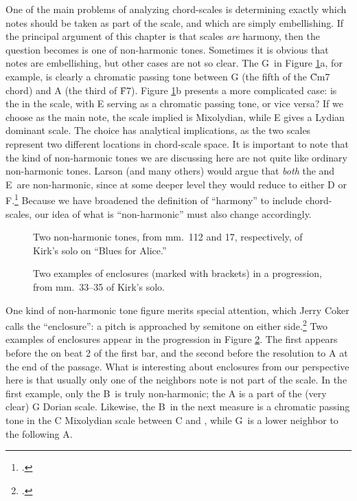 One of the main problems of analyzing chord-scales is determining exactly
which notes should be taken as part of the scale, and which are simply
embellishing. If the principal argument of this chapter is that scales
\emph{are} harmony, then the question becomes is one of non-harmonic tones.
Sometimes it is obvious that notes are embellishing, but other cases are not
so clear. The G\sharp\ in Figure \ref{csa:non-harmonic-tones}a, for example,
is clearly a chromatic passing tone between G (the fifth of the \h{Cm7} chord)
and A (the third of \h{F7}). Figure \ref{csa:non-harmonic-tones}b presents a
more complicated case: is the \Eflat in the scale, with E\nat{} serving as a
chromatic passing tone, or vice versa? If we choose \Eflat as the main note,
the scale implied is \Bflat Mixolydian, while E\nat{} gives a \Bflat Lydian
dominant scale. The choice has analytical implications, as the two scales
represent two different locations in chord-scale space. It is important to
note that the kind of non-harmonic tones we are discussing here are not quite
like ordinary non-harmonic tones. Larson (and many others) would argue that
\emph{both} the \Eflat and E\nat\ are non-harmonic, since at some deeper
level they would reduce to either D or F.\footcite[5--10]{larson:2009} Because
we have broadened the definition of ``harmony'' to include chord-scales, our
idea of what is ``non-harmonic'' must also change accordingly.

\begin{figure}[tbp]
  \caption[Two non-harmonic tones in Kirk's solo.]{Two non-harmonic tones, from
    mm.~112 and 17, respectively, of Kirk's solo on ``Blues for Alice.''}
  \label{csa:non-harmonic-tones}
\end{figure}

\begin{figure}[tbp]
  \caption[Two examples of enclosures in a \tfo progression.]{Two examples of
    enclosures (marked with brackets) in a \tfo progression, from mm.~33--35
    of Kirk's solo.}
  \label{csa:enclosures}
\end{figure}

One kind of non-harmonic tone figure merits special attention, which Jerry
Coker calls the ``enclosure'': a pitch is approached by semitone on
either side.\footcite[50--54]{coker:elements} Two examples of enclosures
appear in the \tfo progression in Figure \ref{csa:enclosures}. The first
appears before the \Bflat on beat 2 of the first bar, and the second before
the resolution to A at the end of the passage. What is interesting about
enclosures from our perspective here is that usually only one of the neighbors
note is not part of the scale. In the first example, only the B\nat\ is truly
non-harmonic; the A is a part of the (very clear) G Dorian scale. Likewise,
the B\nat\ in the next measure is a chromatic passing tone in the C Mixolydian
scale between C and \Bflat, while G\sharp\ is a lower neighbor to the
following A.

